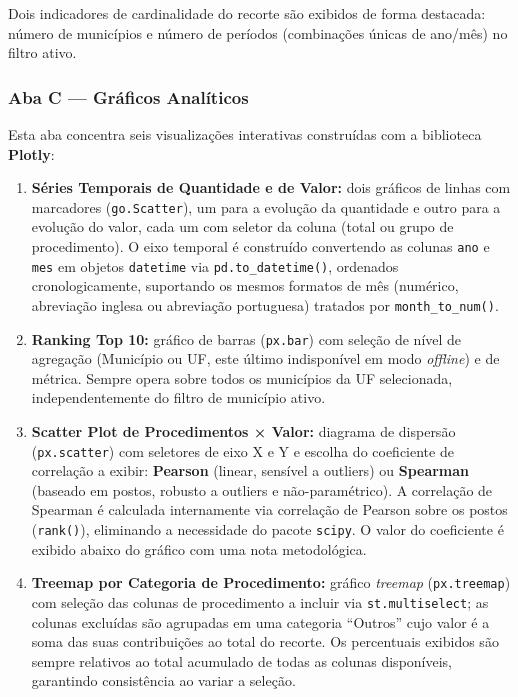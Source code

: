\documentclass[12pt,a4paper]{report}
\begin{document}
Dois indicadores de cardinalidade do recorte são exibidos de forma destacada: número
de municípios e número de períodos (combinações únicas de ano/mês) no filtro ativo.

\subsubsection*{Aba C — Gráficos Analíticos}

Esta aba concentra seis visualizações interativas construídas com a biblioteca
\textbf{Plotly}:

\begin{enumerate}
    \item \textbf{Séries Temporais de Quantidade e de Valor:} dois gráficos de linhas
    com marcadores (\texttt{go.Scatter}), um para a evolução da quantidade e outro para
    a evolução do valor, cada um com seletor da coluna (total ou grupo de procedimento).
    O eixo temporal é construído convertendo as colunas \texttt{ano} e
    \texttt{mes} em objetos \texttt{datetime} via \texttt{pd.to\_datetime()},
    ordenados cronologicamente, suportando os mesmos formatos de mês (numérico,
    abreviação inglesa ou abreviação portuguesa) tratados por \texttt{month\_to\_num()}.

    \item \textbf{Ranking Top 10:} gráfico de barras (\texttt{px.bar}) com seleção de
    nível de agregação (Município ou UF, este último indisponível em modo
    \textit{offline}) e de métrica. Sempre opera sobre todos os municípios da UF
    selecionada, independentemente do filtro de município ativo.

    \item \textbf{Scatter Plot de Procedimentos × Valor:} diagrama de dispersão
    (\texttt{px.scatter}) com seletores de eixo X e Y e escolha do coeficiente de
    correlação a exibir: \textbf{Pearson} (linear, sensível a outliers) ou
    \textbf{Spearman} (baseado em postos, robusto a outliers e não-paramétrico).
    A correlação de Spearman é calculada internamente via correlação de Pearson sobre
    os postos (\texttt{rank()}), eliminando a necessidade do pacote \texttt{scipy}.
    O valor do coeficiente é exibido abaixo do gráfico com uma nota metodológica.

    \item \textbf{Treemap por Categoria de Procedimento:} gráfico \textit{treemap}
    (\texttt{px.treemap}) com seleção das colunas de procedimento a incluir via
    \texttt{st.multiselect}; as colunas excluídas são agrupadas em uma categoria
    ``Outros'' cujo valor é a soma das suas contribuições ao total do recorte.
    Os percentuais exibidos são sempre relativos ao total acumulado de todas as colunas
    disponíveis, garantindo consistência ao variar a seleção.


\end{enumerate}
\end{document}

